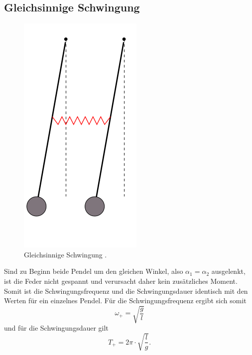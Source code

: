 \subsection{Gleichsinnige Schwingung}
\FloatBarrier
\begin{figure}
	\centering
	\includegraphics[width=0.4\linewidth]{Bilder/gleichphasig.png}
	\caption{Gleichsinnige Schwingung \cite{Anleitung}.}
	\label{fig:gleich}
\end{figure}
\FloatBarrier
Sind zu Beginn beide Pendel um den gleichen Winkel, also $\alpha_1=\alpha_2$ ausgelenkt, ist die Feder nicht gespannt und verursacht daher kein zusätzliches Moment.
Somit ist die Schwingungsfrequenz und die Schwingungsdauer identisch mit den Werten für ein einzelnes Pendel.
Für die Schwingungsfrequenz ergibt sich somit
\begin{equation}
	\omega_{\mathrm{+}}=\sqrt{\frac{g}{l}}
\end{equation}
und für die Schwingungsdauer gilt
\begin{equation}
	T_{\mathrm{+}}=2\pi\cdot\sqrt{\frac{l}{g}} \text{.}
\end{equation}

